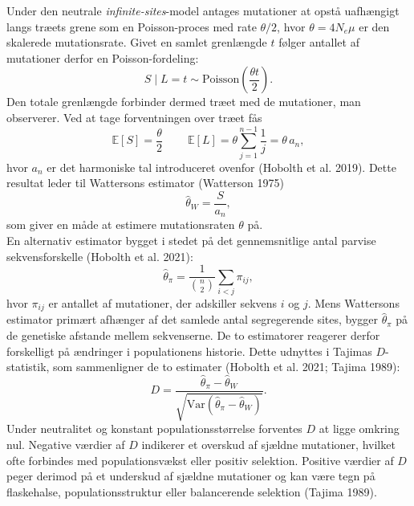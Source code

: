 \documentclass[
  10pt,
  a4paper,
]{scrbook}
\let\oldemph\emph
\renewcommand\emph[1]{\oldemph{\color{gray}#1}}
\begin{document}
Under den neutrale \emph{infinite-sites}-model antages mutationer at
opstå uafhængigt langs træets grene som en Poisson-proces med rate
\(\theta/2\), hvor \(\theta=4N_e \mu\) er den skalerede mutationsrate.
Givet en samlet grenlængde \(t\) følger antallet af mutationer derfor en
Poisson-fordeling: \[
S \mid L = t \sim \mathrm{Poisson}\!\left(\frac{\theta t}{2}\right).
\] Den totale grenlængde forbinder dermed træet med de mutationer, man
observerer. Ved at tage forventningen over træet fås \[
\mathbb{E}[S] = \frac{\theta}{2}\ \qquad \mathbb{E}[L] = \theta \sum_{j=1}^{n-1} \frac{1}{j} = \theta\, a_n,
\] hvor \(a_n\) er det harmoniske tal introduceret ovenfor (Hobolth et
al. 2019). Dette resultat leder til Wattersons estimator (Watterson
1975) \[
\hat{\theta}_W = \frac{S}{a_n},
\] som giver en måde at estimere mutationsraten \(\theta\) på.\\
En alternativ estimator bygget i stedet på det gennemsnitlige antal
parvise sekvensforskelle (Hobolth et al. 2021): \[
\hat{\theta}_\pi = \frac{1}{\binom{n}{2}} \sum_{i < j} \pi_{ij},
\] hvor \(\pi_{ij}\) er antallet af mutationer, der adskiller sekvens
\(i\) og \(j\). Mens Wattersons estimator primært afhænger af det
samlede antal segregerende sites, bygger \(\hat{\theta}_\pi\) på de
genetiske afstande mellem sekvenserne. De to estimatorer reagerer derfor
forskelligt på ændringer i populationens historie. Dette udnyttes i
Tajimas \(D\)-statistik, som sammenligner de to estimater (Hobolth et
al. 2021; Tajima 1989): \[
D = \frac{\hat{\theta}_\pi - \hat{\theta}_W}{\sqrt{\mathrm{Var}(\hat{\theta}_\pi - \hat{\theta}_W)}}.
\] Under neutralitet og konstant populationsstørrelse forventes \(D\) at
ligge omkring nul. Negative værdier af \(D\) indikerer et overskud af
sjældne mutationer, hvilket ofte forbindes med populationsvækst eller
positiv selektion. Positive værdier af \(D\) peger derimod på et
underskud af sjældne mutationer og kan være tegn på flaskehalse,
populationsstruktur eller balancerende selektion (Tajima 1989).
\end{document}
